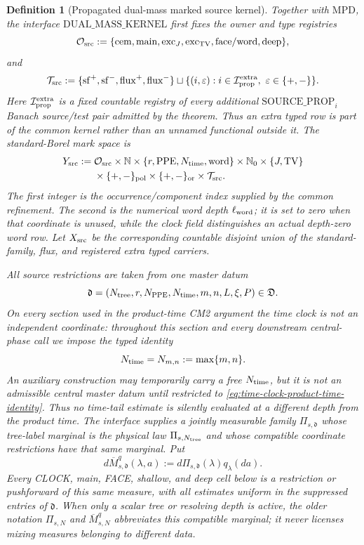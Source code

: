 \documentclass[11pt]{article}
\newtheorem{definition}[theorem]{Definition}
\begin{document}
\begin{definition}[Propagated dual-mass marked source kernel]
\label{def:source-incidence-space}
Together with $\mathrm{MPD}$, the interface
$\mathrm{DUAL\_MASS\_KERNEL}$ first fixes the owner and type registries
\[
 \mathcal O_{\rm src}:=
 \{{\rm cem},{\rm main},{\rm exc}_J,{\rm exc}_{\rm TV},
   {\rm face/word},{\rm deep}\},
\]
and
\[
 \mathcal T_{\rm src}:=
 \{{\rm sf}^{+},{\rm sf}^{-},{\rm flux}^{+},{\rm flux}^{-}\}
 \sqcup\{(i,\varepsilon):i\in\mathcal I_{\rm prop}^{\rm extra},
                    \ \varepsilon\in\{+,-\}\}.
\]
Here $\mathcal I_{\rm prop}^{\rm extra}$ is a fixed countable registry of
every additional $\mathrm{SOURCE\_PROP}_i$ Banach source/test pair admitted
by the theorem.  Thus an extra typed row is part of the common kernel rather
than an unnamed functional outside it.  The standard-Borel mark space is
\[
 \begin{aligned}
 Y_{\rm src}:={}&\mathcal O_{\rm src}\times\mathbb N\times
 \{r,\mathrm{PPE},N_{\rm time},\mathrm{word}\}\times
 \mathbb N_0\times\{J,\mathrm{TV}\}\\
 &\times\{+,-\}_{\rm pol}\times\{+,-\}_{\rm or}\times
 \mathcal T_{\rm src}.
 \end{aligned}
\]
The first integer is the occurrence/component index supplied by the common
refinement.  The second is the numerical word depth $\ell_{\rm word}$; it is
set to zero when that coordinate is unused, while the clock field
distinguishes an actual depth-zero word row.  Let $X_{\rm src}$ be the corresponding countable disjoint union
of the standard-family, flux, and registered extra typed carriers.

All source restrictions are taken from one master datum
\[
 \mathfrak d=(N_{\rm tree},r,N_{\rm PPE},N_{\rm time},m,n,L,\xi,P)
 \in\mathfrak D.
\]
On every section used in the product-time CM2 argument the time clock is not
an independent coordinate: throughout this section and every downstream
central-phase call we impose the typed identity
\begin{equation}
\label{eq:time-clock-product-time-identity}
 N_{\rm time}=N_{m,n}:=\max\{m,n\}.
\end{equation}
An auxiliary construction may temporarily carry a free $N_{\rm time}$, but
it is not an admissible central master datum until restricted to
\eqref{eq:time-clock-product-time-identity}.  Thus no time-tail estimate is
silently evaluated at a different depth from the product time.
The interface supplies a jointly measurable family
$\Pi_{s,\mathfrak d}$ whose tree-label marginal is the physical law
$\Pi_{s,N_{\rm tree}}$ and whose compatible coordinate restrictions have
that same marginal.  Put
\[
 d\overline M_{s,\mathfrak d}^{q}(\lambda,a)
 :=d\Pi_{s,\mathfrak d}(\lambda)q_\lambda(da).
\]
Every CLOCK, main, FACE, shallow, and deep cell below is a restriction or
pushforward of this same measure, with all estimates uniform in the
suppressed entries of $\mathfrak d$.  When only a scalar tree or resolving
depth is active, the older notation $\Pi_{s,N}$ and
$\overline M_{s,N}^{q}$ abbreviates this compatible marginal; it never
licenses mixing measures belonging to different data.


\end{definition}
\end{document}
